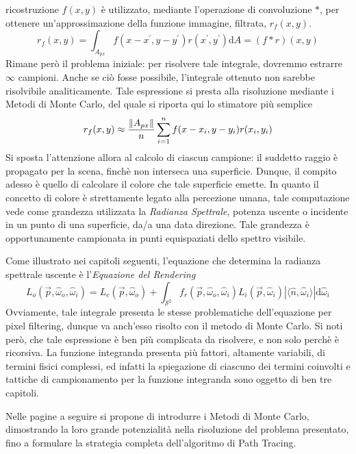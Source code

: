 \documentclass[12pt, openany]{book}
\theoremstyle{theoremdd}
\begin{document}
	ricostruzione $f(x,y)$ \`e utilizzato, mediante l'operazione di convoluzione $*$, per ottenere un'approssimazione della funzione immagine, filtrata,
	$r_f(x,y)$.
	\begin{equation}
		r_f(x,y)=\int_{A_{px}}f(x-x^\prime,y-y^\prime)r(x^\prime,y^\prime)\mathrm{d}A = (f*r)(x,y)
	\end{equation}
	Rimane per\`o il problema iniziale: per risolvere tale integrale, dovremmo estrarre $\infty$ campioni. Anche se ci\`o fosse possibile, l'integrale
	ottenuto non sarebbe risolvibile analiticamente. Tale espressione si presta alla risoluzione mediante i Metodi di Monte Carlo, del quale si 
	riporta qui lo stimatore pi\`u semplice
	\begin{equation}
		r_f(x,y)\approx\frac{\norm{A_{px}}}{n}\sum_{i=1}^{n}f(x-x_i,y-y_i)r(x_i,y_i)
	\end{equation}
	Si sposta l'attenzione allora al calcolo di ciascun campione: il suddetto raggio \`e propagato per la scena, finch\`e non interseca una superficie.
	Dunque, il compito adesso \`e quello di calcolare il colore che tale superficie emette. In quanto il concetto di colore \`e strettamente legato 
	alla percezione umana, tale computazione vede come grandezza utilizzata la \textit{Radianza Spettrale}, potenza uscente o incidente in un punto di 
	una superficie, da/a una data direzione. Tale grandezza \`e opportunamente campionata in punti equispaziati dello spettro visibile.\par 
	Come illustrato nei capitoli seguenti, l'equazione che determina la radianza spettrale uscente \`e l'\textit{Equazione del Rendering}
	\begin{equation}
		L_o(\vec{p},\hat{\omega}_o,\hat{\omega}_i)=L_e(\vec{p},\hat{\omega}_o)+%
			\int_{\mathcal{S}^2}f_r(\vec{p},\hat{\omega}_o,\hat{\omega}_i)L_i(\vec{p},\hat{\omega}_i)|\langle\hat{n},\hat{\omega}_i\rangle|
				\mathrm{d}\hat{\omega}_i
	\end{equation}
	Ovviamente, tale integrale presenta le stesse problematiche dell'equazione per pixel filtering, dunque va anch'esso risolto con il metodo di 
	Monte Carlo. Si noti per\`o, che tale espressione \`e ben pi\`u complicata da risolvere, e non solo perch\`e \`e ricorsiva.
	La funzione integranda presenta pi\`u fattori, altamente variabili, di termini fisici complessi, ed infatti la spiegazione di ciascuno 
	dei termini coinvolti e tattiche di campionamento per la funzione integranda sono oggetto di ben tre capitoli.\par
	Nelle pagine a seguire si propone di introdurre i Metodi di Monte Carlo, dimostrando la loro grande potenzialit\`a nella risoluzione del problema 
	presentato, fino a formulare la strategia completa dell'algoritmo di Path Tracing.
\end{document}
